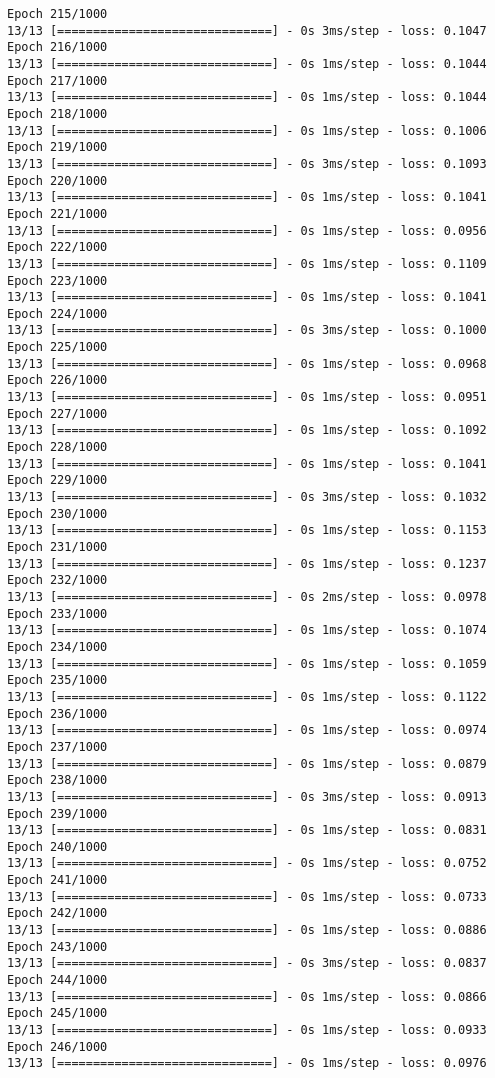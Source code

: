 \documentclass[11pt]{article}
\begin{document}
\begin{Verbatim}[commandchars=\\\{\}]
Epoch 215/1000
13/13 [==============================] - 0s 3ms/step - loss: 0.1047
Epoch 216/1000
13/13 [==============================] - 0s 1ms/step - loss: 0.1044
Epoch 217/1000
13/13 [==============================] - 0s 1ms/step - loss: 0.1044
Epoch 218/1000
13/13 [==============================] - 0s 1ms/step - loss: 0.1006
Epoch 219/1000
13/13 [==============================] - 0s 3ms/step - loss: 0.1093
Epoch 220/1000
13/13 [==============================] - 0s 1ms/step - loss: 0.1041
Epoch 221/1000
13/13 [==============================] - 0s 1ms/step - loss: 0.0956
Epoch 222/1000
13/13 [==============================] - 0s 1ms/step - loss: 0.1109
Epoch 223/1000
13/13 [==============================] - 0s 1ms/step - loss: 0.1041
Epoch 224/1000
13/13 [==============================] - 0s 3ms/step - loss: 0.1000
Epoch 225/1000
13/13 [==============================] - 0s 1ms/step - loss: 0.0968
Epoch 226/1000
13/13 [==============================] - 0s 1ms/step - loss: 0.0951
Epoch 227/1000
13/13 [==============================] - 0s 1ms/step - loss: 0.1092
Epoch 228/1000
13/13 [==============================] - 0s 1ms/step - loss: 0.1041
Epoch 229/1000
13/13 [==============================] - 0s 3ms/step - loss: 0.1032
Epoch 230/1000
13/13 [==============================] - 0s 1ms/step - loss: 0.1153
Epoch 231/1000
13/13 [==============================] - 0s 1ms/step - loss: 0.1237
Epoch 232/1000
13/13 [==============================] - 0s 2ms/step - loss: 0.0978
Epoch 233/1000
13/13 [==============================] - 0s 1ms/step - loss: 0.1074
Epoch 234/1000
13/13 [==============================] - 0s 1ms/step - loss: 0.1059
Epoch 235/1000
13/13 [==============================] - 0s 1ms/step - loss: 0.1122
Epoch 236/1000
13/13 [==============================] - 0s 1ms/step - loss: 0.0974
Epoch 237/1000
13/13 [==============================] - 0s 1ms/step - loss: 0.0879
Epoch 238/1000
13/13 [==============================] - 0s 3ms/step - loss: 0.0913
Epoch 239/1000
13/13 [==============================] - 0s 1ms/step - loss: 0.0831
Epoch 240/1000
13/13 [==============================] - 0s 1ms/step - loss: 0.0752
Epoch 241/1000
13/13 [==============================] - 0s 1ms/step - loss: 0.0733
Epoch 242/1000
13/13 [==============================] - 0s 1ms/step - loss: 0.0886
Epoch 243/1000
13/13 [==============================] - 0s 3ms/step - loss: 0.0837
Epoch 244/1000
13/13 [==============================] - 0s 1ms/step - loss: 0.0866
Epoch 245/1000
13/13 [==============================] - 0s 1ms/step - loss: 0.0933
Epoch 246/1000
13/13 [==============================] - 0s 1ms/step - loss: 0.0976

\end{Verbatim}
\end{document}
